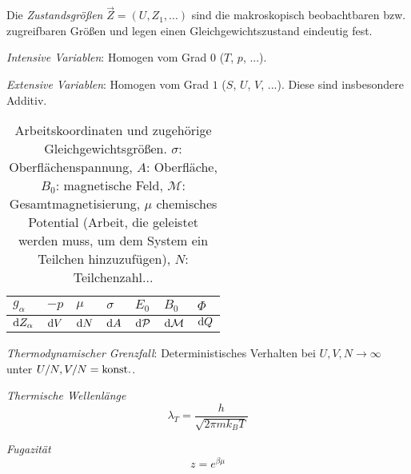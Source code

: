 			Die \emph{Zustandsgrößen} $\vec{Z}=\left(U, Z_1,... \right)$ sind die makroskopisch beobachtbaren bzw. zugreifbaren Größen und legen einen Gleichgewichtszustand eindeutig fest. \vsp

			\emph{Intensive Variablen}: Homogen vom Grad $0$ ($T$, $p$, ...). \vsp

			\emph{Extensive Variablen}: Homogen vom Grad $1$ ($S$, $U$, $V$, ...). Diese sind insbesondere Additiv. \vsp

			\begin{table}[h]
				\begin{center}
				\begin{tabular}{ l | l l l l l l }
					$g_\alpha$ & $-p$ & $\mu$ & $\sigma$ & $E_0$ & $B_0$ & $\Phi$ \\ \hline
					$\mathrm{d} Z_\alpha$ & $\mathrm{d} V$ & $\mathrm{d} N$ & $\mathrm{d} A$ & $\mathrm{d} \mathcal{P}$ & $\mathrm{d} \mathcal{M}$ & $\mathrm{d} Q$ \\
					\end{tabular}
				\caption{Arbeitskoordinaten und zugehörige Gleichgewichtsgrößen. $\sigma$: Oberflächenspannung, $A$: Oberfläche, $B_0$: magnetische Feld, $\mathcal{M}$: Gesamtmagnetisierung, $\mu$ chemisches Potential (Arbeit, die geleistet werden muss, um dem System ein Teilchen hinzuzufügen), $N$: Teilchenzahl...}
				\label{tab:ArbeitskoordinatenUndGleichgewichtsgroessen}
				\end{center}
			\end{table} \vsp

			\noindent
			\emph{Thermodynamischer Grenzfall}: \newline Deterministisches Verhalten bei $U,V,N\rightarrow\infty$ unter $U/N,V/N=\mathrm{konst.}$. \vsp


			\noindent
			\emph{Thermische Wellenlänge}
			\begin{equation}
				\lambda_T = \frac{h}{\sqrt{2\pi m k_B T}}
			\end{equation} \vsp

			\noindent
			\emph{Fugazität}
			\begin{equation}
				z = e^{\beta\mu}
			\end{equation} \vsp

